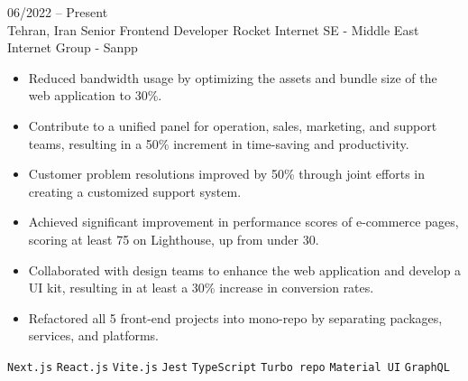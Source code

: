 \documentclass[8pt]{developercv} %
\begin{document}
    \vspace{-10 pt}
    \begin{entrylist}
        \entry
        {06/2022 -- Present \\ Tehran, Iran}
        {Senior Frontend Developer}
        {Rocket Internet SE - Middle East Internet Group - Sanpp}
        {\vspace{-10pt}
            \begin{itemize}[noitemsep,topsep=0pt,parsep=0pt,partopsep=0pt, leftmargin=-1pt]
                \item Reduced bandwidth usage by optimizing the assets and bundle size of the web application to 30\%.
                \item Contribute to a unified panel for operation, sales, marketing, and support teams, resulting in a 50\% increment in time-saving and productivity.
                \item Customer problem resolutions improved by 50\% through joint efforts in creating a customized support system.
                \item Achieved significant improvement in performance scores of e-commerce pages, scoring at least 75 on Lighthouse, up from under 30.
                \item Collaborated with design teams to enhance the web application and develop a UI kit, resulting in at least a 30\% increase in conversion rates.
                \item Refactored all 5 front-end projects into mono-repo by separating packages, services, and platforms.
            \end{itemize}
            \texttt{Next.js} \slashsep \texttt{React.js} \slashsep \texttt{Vite.js} \slashsep \texttt{Jest} \slashsep \texttt{TypeScript} \slashsep \texttt{Turbo repo} \slashsep \texttt{Material UI} \slashsep \texttt{GraphQL}
        }


\end{entrylist}
\end{document}
